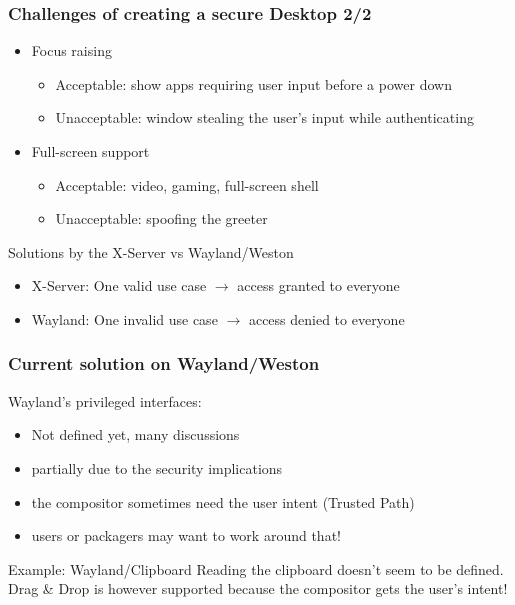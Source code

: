 \begin{frame}
\frametitle{Challenges of creating a secure Desktop 2/2}

	\begin{block}{}
		\begin{itemize}
			\item Focus raising
			\begin{itemize}
				\item Acceptable: show apps requiring user input before a power down
				\item Unacceptable: window stealing the user's input while authenticating
			\end{itemize}
			\item Full-screen support
			\begin{itemize}
				\item Acceptable: video, gaming, full-screen shell
				\item Unacceptable: spoofing the greeter
			\end{itemize}
		\end{itemize}
	\end{block}

	\begin{block}{Solutions by the X-Server vs Wayland/Weston}
		\begin{itemize}
			\item X-Server: One valid use case $\rightarrow$ access granted to everyone
			\item Wayland: One invalid use case $\rightarrow$ access denied to everyone
		\end{itemize}
	\end{block}
\end{frame}

\begin{frame}
\frametitle{Current solution on Wayland/Weston}
	\begin{block}{Wayland's privileged interfaces:}
		\begin{itemize}
			\item Not defined yet, many discussions
			\item partially due to the security implications
			\item the compositor sometimes need the user intent (Trusted Path)
			\item users or packagers may want to work around that!
		\end{itemize}
	\end{block}

	\begin{block}{Example: Wayland/Clipboard}
		Reading the clipboard doesn't seem to be defined. Drag \& Drop is however supported
		because the compositor gets the user's intent!
	\end{block}
\end{frame}

